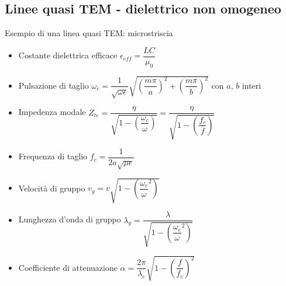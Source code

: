 \documentclass{article}
\begin{document}
\subsection{Linee quasi TEM - dielettrico non omogeneo}
Esempio di una linea quasi TEM: microstriscia
\begin{itemize}
	\item Costante dielettrica efficace \( \epsilon_{eff} = \dfrac{LC}{\mu_0} \)
	\item Pulsazione di taglio \( \omega_c = \dfrac{1}{\sqrt{\omega \epsilon}} \sqrt{\left( \dfrac{m \pi}{a}\right)^2 + \left( \dfrac{m \pi}{b} \right)^2 }\) con \(a\), \(b\) interi
	\item Impedenza modale \( Z_{te} = \dfrac{\eta}{\sqrt{1-\left(\dfrac{\omega_c}{\omega} \right) }} = \dfrac{\eta}{\sqrt{1-\left(\dfrac{f_c}{f} \right) }} \)
	\item Frequenza di taglio \( f_c = \dfrac{1}{2a \sqrt{\mu \epsilon}} \)
	\item Velocità di gruppo \( v_g = v \sqrt{1- \left( \dfrac{\omega_c}{\omega} ^ 2 \right)} \)
	\item Lunghezza d'onda di gruppo \( \lambda_g = \dfrac{\lambda}{\sqrt{1- \left( \dfrac{\omega_c}{\omega} ^ 2 \right)}}\)
	\item Coefficiente di attenuazione \( \alpha = \dfrac{2 \pi}{\lambda_c} \sqrt{1 - \left( \dfrac{f}{f_c} \right) ^ 2} \)
\end{itemize}

\newpage 
\end{document}
